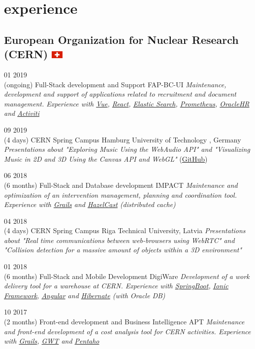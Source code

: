 \documentclass[]{friggeri-cv}
\begin{document}
\section{experience}
	\subsection{European Organization for Nuclear Research (CERN) \includegraphics[width=16pt]{ch} }  
		\begin{entrylist}

			\entry
			{01 2019\\(ongoing)}
			{Full-Stack development and Support}
			{FAP-BC-UI}
			{\emph{Maintenance, development and support of applications related to recruitment and document management. Experience with \underline{Vue}, \underline{React}, \underline{Elastic Search}, \underline{Prometheus}, \underline{OracleHR} and \underline{Activiti}} }


			\entry
			{09 2019\\(4 days)}
			{CERN Spring Campus}
			{Hamburg University of Technology , Germany}
			{\emph{Presentations about "Exploring Music Using the WebAudio API" and "Visualizing Music in 2D and 3D Using the Canvas API and WebGL"} (\href{https://hdlopesrocha.github.io/spring-campus-2019/dist/spring/}{GitHub})}

			\entry
			{06 2018\\(6 months)}
			{Full-Stack and Database development}
			{IMPACT}
			{\emph{Maintenance and optimization of an intervention management, planning and coordination tool. Experience with \underline{Grails} and \underline{HazelCast} (distributed cache)} }


			\entry
			{04 2018\\(4 days)}
			{CERN Spring Campus}
			{Riga Technical University, Latvia}
			{\emph{Presentations about "Real time communications between web-browsers using WebRTC" and "Collision detection for a massive amount of objects within a 3D environment"} }


			\entry
			{01 2018\\(6 months)}
			{Full-Stack and Mobile Development}
			{DigiWare}
			{\emph{Development of a work delivery tool for a warehouse at CERN. Experience with \underline{SpringBoot}, \underline{Ionic Framework}, \underline{Angular} and \underline{Hibernate} (with Oracle DB) } }

			\entry
			{10 2017\\(2 months)}
			{Front-end development and Business Intelligence}
			{APT}
			{\emph{Maintenance and front-end development of a cost analysis tool for CERN activities. Experience with \underline{Grails}, \underline{GWT} and \underline{Pentaho} } }


\end{entrylist}
\end{document}
